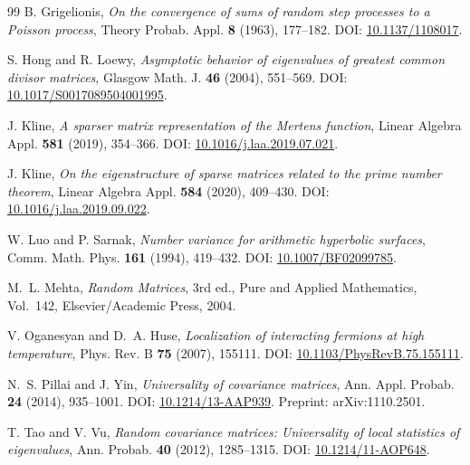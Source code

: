 \documentclass[11pt]{amsart}
\numberwithin{equation}{section}
\theoremstyle{plain}
\theoremstyle{definition}
\theoremstyle{remark}
\begin{document}
\begin{thebibliography}{99}
B. Grigelionis,
\emph{On the convergence of sums of random step processes to a Poisson process},
Theory Probab. Appl. \textbf{8} (1963), 177--182.
DOI: \href{https://doi.org/10.1137/1108017}{10.1137/1108017}.

S. Hong and R. Loewy,
\emph{Asymptotic behavior of eigenvalues of greatest common divisor matrices},
Glasgow Math. J. \textbf{46} (2004), 551--569.
DOI: \href{https://doi.org/10.1017/S0017089504001995}{10.1017/S0017089504001995}.

J. Kline,
\emph{A sparser matrix representation of the Mertens function},
Linear Algebra Appl. \textbf{581} (2019), 354--366.
DOI: \href{https://doi.org/10.1016/j.laa.2019.07.021}{10.1016/j.laa.2019.07.021}.

J. Kline,
\emph{On the eigenstructure of sparse matrices related to the prime number theorem},
Linear Algebra Appl. \textbf{584} (2020), 409--430.
DOI: \href{https://doi.org/10.1016/j.laa.2019.09.022}{10.1016/j.laa.2019.09.022}.

W. Luo and P. Sarnak,
\emph{Number variance for arithmetic hyperbolic surfaces},
Comm. Math. Phys. \textbf{161} (1994), 419--432.
DOI: \href{https://doi.org/10.1007/BF02099785}{10.1007/BF02099785}.

M.~L. Mehta,
\emph{Random Matrices}, 3rd ed.,
Pure and Applied Mathematics, Vol.~142,
Elsevier/Academic Press, 2004.

V. Oganesyan and D.~A. Huse,
\emph{Localization of interacting fermions at high temperature},
Phys. Rev. B \textbf{75} (2007), 155111.
DOI: \href{https://doi.org/10.1103/PhysRevB.75.155111}{10.1103/PhysRevB.75.155111}.

N.~S. Pillai and J. Yin,
\emph{Universality of covariance matrices},
Ann. Appl. Probab. \textbf{24} (2014), 935--1001.
DOI: \href{https://doi.org/10.1214/13-AAP939}{10.1214/13-AAP939}.
Preprint: arXiv:1110.2501.

T. Tao and V. Vu,
\emph{Random covariance matrices: Universality of local statistics of eigenvalues},
Ann. Probab. \textbf{40} (2012), 1285--1315.
DOI: \href{https://doi.org/10.1214/11-AOP648}{10.1214/11-AOP648}.

\end{thebibliography}
\end{document}
